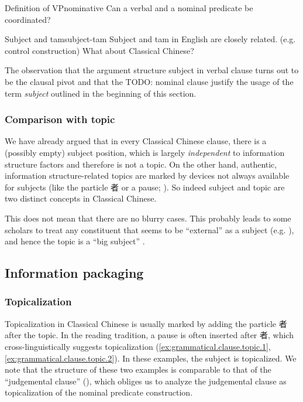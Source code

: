 \documentclass[UTF8, a4paper, oneside, scheme=plain, 12pt]{ctexrep}
\newcommand*{\citepage}[1]{p.~{#1}}
\newcommand*{\term}[1]{\emph{#1}}
\begin{document}
\begin{todobox}{Definition of VP}{nominative} 
    Can a verbal and a nominal predicate be coordinated? 
\end{todobox}

\begin{todobox}{Subject and \ac{tam}}{subject-tam}
    Subject and \ac{tam} in English are closely related. (e.g. control construction)
    What about Classical Chinese?
\end{todobox}

The observation that the argument structure subject in verbal clause
turns out to be the clausal pivot 
and that the TODO: nominal clause 
justify the usage of the term \term{subject} outlined in the beginning of this section.

\subsubsection{Comparison with topic}\label{sec:grammatical.verbal.subject.topic-comparison}

We have already argued that in every Classical Chinese clause,
there is a (possibly empty) subject position,
which is largely \emph{independent} to information structure factors
and therefore is not a topic.
On the other hand, authentic, information structure-related topics
are marked by devices not always available for subjects
(like the particle 者 or a pause; ).
So indeed subject and topic are two distinct concepts in Classical Chinese.

This does not mean that there are no blurry cases. 
This probably leads to some scholars to treat any constituent that seems to be ``external'' as a subject
(e.g. \citealt[\citepage{41}]{li2004grammar}),
and hence the topic is a ``big subject''
\citep[\citepage{42}]{li2004grammar}.

\subsection{Information packaging}\label{sec:grammatical.clause.information}

\subsubsection{Topicalization}\label{sec:grammatical.clause.topic}

Topicalization in Classical Chinese is usually marked by adding the particle 者 after the topic.
In the reading tradition, a pause is often inserted after 者,
which cross-linguistically suggests topicalization
(\ref{ex:grammatical.clause.topic.1}, \ref{ex:grammatical.clause.topic.2}).
In these examples, the subject is topicalized.
We note that the structure of these two examples is comparable to that of the ``judgemental clause''
(),
which obliges us to analyze the judgemental clause as topicalization of the nominal predicate construction.
\end{document}
